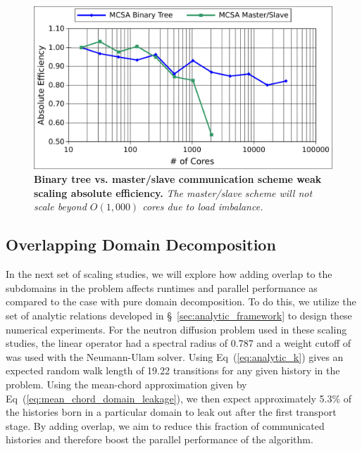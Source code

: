 \begin{figure}[t!]
  \begin{center}
    \includegraphics[width=6in]{chapters/parallel_mc/titan_weak_bvsm.pdf}
  \end{center}
  \caption{\textbf{Binary tree vs. master/slave communication scheme
      weak scaling absolute efficiency.}  \textit{The master/slave
      scheme will not scale beyond $O(1,000)$ cores due to load
      imbalance.}}
  \label{fig:titan_weak_bvsm}
\end{figure}

\clearpage

\subsection{Overlapping Domain Decomposition}
\label{subsec:overlapping_domain_decomp}

In the next set of scaling studies, we will explore how adding overlap
to the subdomains in the problem affects runtimes and parallel
performance as compared to the case with pure domain decomposition. To
do this, we utilize the set of analytic relations developed in
\S~\ref{sec:analytic_framework} to design these numerical
experiments. For the neutron diffusion problem used in these scaling
studies, the linear operator had a spectral radius of 0.787 and a
weight cutoff of  was used with the Neumann-Ulam
solver. Using Eq~(\ref{eq:analytic_k}) gives an expected random walk
length of 19.22 transitions for any given history in the
problem. Using the mean-chord approximation given by
Eq~(\ref{eq:mean_chord_domain_leakage}), we then expect approximately
5.3\% of the histories born in a particular domain to leak out after
the first transport stage. By adding overlap, we aim to reduce this
fraction of communicated histories and therefore boost the parallel
performance of the algorithm. 

